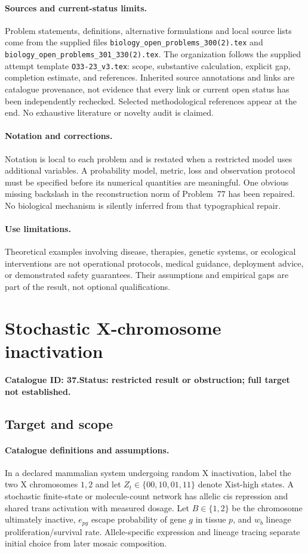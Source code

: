 \documentclass[11pt]{article}
\begin{document}
\paragraph{Sources and current-status limits.}
Problem statements, definitions, alternative formulations and local source lists
come from the supplied files
\texttt{biology\_open\_problems\_300(2).tex} and
\texttt{biology\_open\_problems\_301\_330(2).tex}.
The organization follows the supplied attempt template
\texttt{O33-23\_v3.tex}: scope, substantive calculation, explicit gap,
completion estimate, and references. Inherited source annotations and links are
catalogue provenance, not evidence that every link or current open status has
been independently rechecked. Selected methodological references appear at the
end. No exhaustive literature or novelty audit is claimed.

\paragraph{Notation and corrections.}
Notation is local to each problem and is restated when a restricted model uses
additional variables. A probability model, metric, loss and observation protocol
must be specified before its numerical quantities are meaningful. One obvious
missing backslash in the reconstruction norm of Problem~77 has been repaired.
No biological mechanism is silently inferred from that typographical repair.

\paragraph{Use limitations.}
Theoretical examples involving disease, therapies, genetic systems, or ecological
interventions are not operational protocols, medical guidance, deployment advice,
or demonstrated safety guarantees. Their assumptions and empirical gaps are part
of the result, not optional qualifications.

\setcounter{section}{36}
\section{Stochastic X-chromosome inactivation}
\label{prob:037}
\noindent\textbf{Catalogue ID: 37.}\quad \textbf{Status: restricted result or obstruction; full target not established.}
\subsection{Target and scope}
\paragraph{Catalogue definitions and assumptions.}
In a declared mammalian system undergoing random X inactivation, label the two X chromosomes $1,2$ and let $Z_t\in\{00,10,01,11\}$ denote Xist-high states. A stochastic finite-state or molecule-count network has allelic cis repression and shared trans activation with measured dosage. Let $B\in\{1,2\}$ be the chromosome ultimately inactive, $e_{pg}$ escape probability of gene $g$ in tissue $p$, and $w_b$ lineage proliferation/survival rate. Allele-specific expression and lineage tracing separate initial choice from later mosaic composition.
\end{document}
